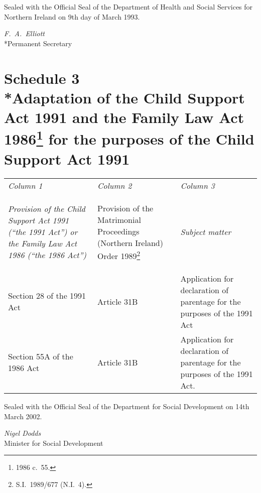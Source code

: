 \documentclass[12pt,a4paper]{article}
\begin{document}
Sealed with the Official Seal of the Department of Health and Social Services for Northern Ireland on 9th day of March 1993.


{\raggedleft
\emph{F.\ A.\ Elliott}\\*Permanent Secretary

}

\vfill

\part[Schedule 3 --- Adaptation of the Child Support Act 1991 and the Family Law Act 1986 for the purposes of the Child Support Act 1991]{Schedule 3\\*Adaptation of the Child Support Act 1991 and the Family Law Act 1986\footnote{1986 c.\ 55.} for the purposes of the Child Support Act 1991}


\medskip

\noindent
{\footnotesize
\begin{longtable}{p{142.207pt}p{100.4398pt}p{111.34279pt}}
\hline
\itshape Column 1	& \itshape Column 2	& \itshape Column 3\\
\itshape Provision of the Child Support Act 1991 (“the 1991 Act”) or the Family Law Act 1986 (“the 1986 Act”)	& \itshape\raggedright Provision of the Matrimonial Proceedings (Northern Ireland) Order 1989\footnote{S.I.\ 1989/677 (N.I.\ 4).}	& \itshape Subject matter\\
\hline
\endhead
\hline
\endlastfoot
Section 28 of the 1991 Act	&Article 31B	&Application for declaration of parentage for the purposes of the 1991 Act\\
Section 55A of the 1986 Act	&Article 31B	&Application for declaration of parentage for the purposes of the 1991 Act.\\
\end{longtable}

}


\bigskip

Sealed with the Official Seal of the Department for Social Development on 14th March 2002.

{\raggedleft
\emph{Nigel Dodds}\\
Minister for Social Development

}
\end{document}
